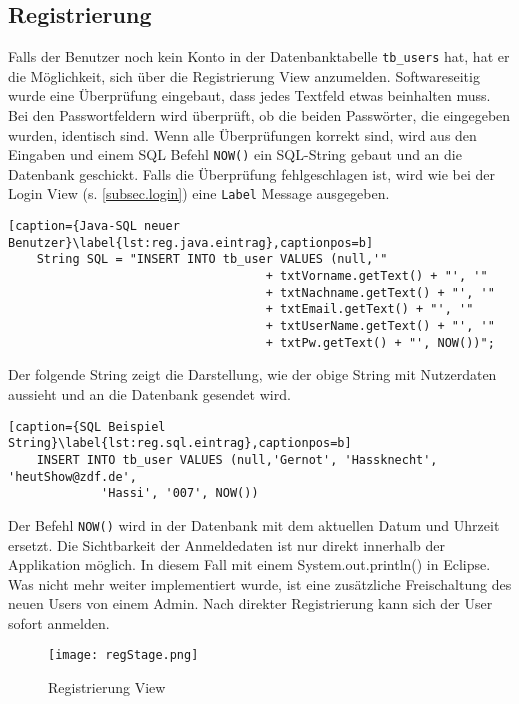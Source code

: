 \subsection{Registrierung}
\label{subsec.registrierung}
Falls der Benutzer noch kein Konto in der Datenbanktabelle \texttt{tb\_users} hat, hat er die Möglichkeit, sich über die Registrierung View anzumelden. Softwareseitig wurde eine Überprüfung eingebaut, dass jedes Textfeld etwas beinhalten muss. Bei den Passwortfeldern wird überprüft, ob die beiden Passwörter, die eingegeben wurden, identisch sind. Wenn alle Überprüfungen korrekt sind, wird aus den Eingaben und einem SQL Befehl \texttt{NOW()} ein SQL-String gebaut und an die Datenbank geschickt. Falls die Überprüfung fehlgeschlagen ist, wird wie bei der Login View (s. \ref{subsec.login}) eine \texttt{Label} Message ausgegeben.
\begin{lstlisting}[caption={Java-SQL neuer Benutzer}\label{lst:reg.java.eintrag},captionpos=b]
	String SQL = "INSERT INTO tb_user VALUES (null,'"
									+ txtVorname.getText() + "', '"
									+ txtNachname.getText() + "', '"
									+ txtEmail.getText() + "', '"
									+ txtUserName.getText() + "', '"
									+ txtPw.getText() + "', NOW())";
\end{lstlisting}
Der folgende String zeigt die Darstellung, wie der obige String mit Nutzerdaten aussieht und an die Datenbank gesendet wird.
\begin{lstlisting}[caption={SQL Beispiel String}\label{lst:reg.sql.eintrag},captionpos=b]
	INSERT INTO tb_user VALUES (null,'Gernot', 'Hassknecht', 'heutShow@zdf.de',
			 'Hassi', '007', NOW())
\end{lstlisting}

Der Befehl \texttt{NOW()} wird in der Datenbank mit dem aktuellen Datum und Uhrzeit ersetzt.
Die Sichtbarkeit der Anmeldedaten ist nur direkt innerhalb der Applikation möglich. In diesem Fall mit einem System.out.println() in Eclipse. Was nicht mehr weiter implementiert wurde, ist eine zusätzliche Freischaltung des neuen Users von einem Admin. Nach direkter Registrierung kann sich der User sofort anmelden.
\begin{figure}[h]
  \begin{center}
    \texttt{[image: regStage.png]}
  		  \caption{Registrierung View}
     \label{fig.RegistrierungFenster}
  \end{center}
\end{figure}

